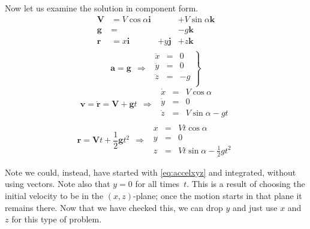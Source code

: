 Now let us examine the solution in component form.
\begin{displaymath}
\begin{array}{llll}
\boldsymbol{V} & = V \cos \alpha \boldsymbol{i} &                & + V \sin \alpha \boldsymbol{k} \\
\boldsymbol{g} & =                          &                & - g \boldsymbol{k}             \\
\boldsymbol{r} & = x \boldsymbol{i}             & + y \boldsymbol{j} & + z \boldsymbol{k}             \\
\end{array}
\end{displaymath}
\vspace{2mm}
\begin{equation}
\boldsymbol{a} = \boldsymbol{g} \ \ 
\Rightarrow \ \ 
\left.
\begin{array}{lll}
\ddot{x} & = & 0 \\
\ddot{y} & = & 0 \\
\ddot{z} & = & -g \\
\end{array}
\right\}
\label{eq:accelxyz}
\end{equation}
\vspace{2mm}
\begin{displaymath}
\boldsymbol{v} = \dot{\boldsymbol{r}} = \boldsymbol{V} + \boldsymbol{g} t \ \ 
\Rightarrow \ \ 
\begin{array}{lll}
\dot{x} & = & V \cos \alpha \\
\dot{y} & = & 0             \\
\dot{z} & = & V \sin \alpha - g t \\
\end{array}
\end{displaymath}
\vspace{2mm}
\begin{displaymath}
\boldsymbol{r} = \boldsymbol{V} t + \frac{1}{2} \boldsymbol{g} t^2 \ \ 
\Rightarrow \ \ 
\begin{array}{lll}
x & = & V t \cos \alpha \\
y & = & 0               \\
z & = & V t \sin \alpha - \frac{1}{2} g t^2
\end{array}
\end{displaymath}

Note we could, instead, have started with \eqref{eq:accelxyz} and integrated, without
using vectors. Note also that $y=0$ for all times~$t$. This is a result of choosing the
initial velocity to be in the $(x,z)$-plane; once the motion starts in that plane it remains
there. Now that we have checked this, we can drop $y$ and just use $x$ and $z$ for
this type of problem.


